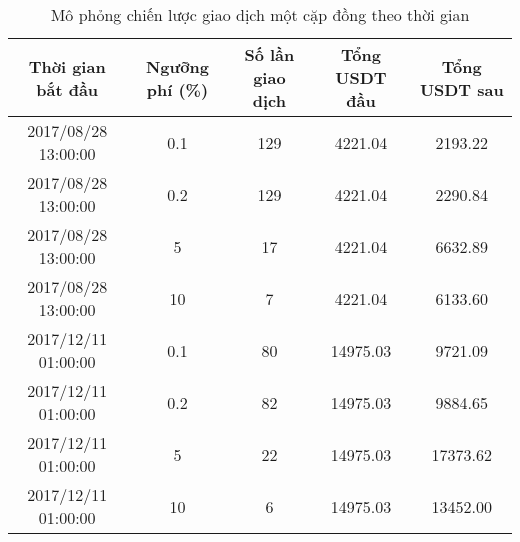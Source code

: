 
\begin{table}[ht]
	
	\centering %
	\begin{tabular}{c c c c c} %
		\hline\hline %
		\multirow{2}{*}{Thời gian bắt đầu}  & \multirow{2}{*}{Ngưỡng phí (\%)} &
		\multirow{2}{*}{Số lần giao dịch} & 
		\multirow{2}{*}{Tổng USDT đầu} & 
		\multirow{2}{*}{Tổng USDT sau} \\[2.5ex] %
		\hline %
		\rowcolor{maroon!10}
		2017/08/28 13:00:00 & 0.1 & 129 & 4221.04 & 2193.22 \\
		\rowcolor{maroon!10}
		2017/08/28 13:00:00 & 0.2 & 129 & 4221.04 & 2290.84 \\
		\rowcolor{LightCyan}
		2017/08/28 13:00:00 & 5 & 17 & 4221.04 & 6632.89 \\
		\rowcolor{LightCyan}
		2017/08/28 13:00:00 & 10 & 7 & 4221.04 & 6133.60 \\
		\rowcolor{maroon!10}
		2017/12/11 01:00:00 & 0.1 & 80 & 14975.03 & 9721.09 \\
		\rowcolor{maroon!10}
		2017/12/11 01:00:00 & 0.2 & 82 & 14975.03 & 9884.65 \\
		\rowcolor{LightCyan}
		2017/12/11 01:00:00 & 5 & 22 & 14975.03 & 17373.62 \\
		\rowcolor{maroon!10}
		2017/12/11 01:00:00 & 10 & 6 & 14975.03 & 13452.00 \\[1ex] %
		
		
		
		\hline %
	\end{tabular}
	\label{table:nonlin} %
	
	\caption{Mô phỏng chiến lược giao dịch một cặp đồng theo thời gian}
\end{table}

